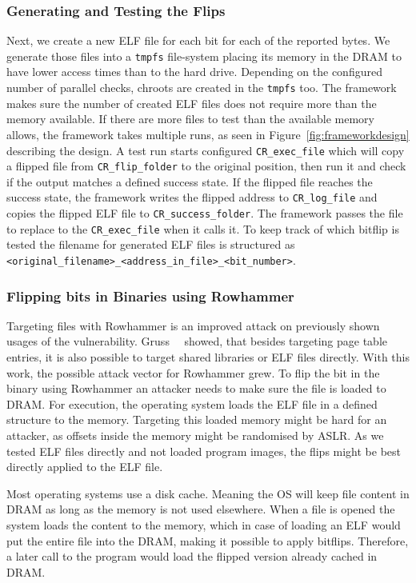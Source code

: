 \subsubsection{Generating and Testing the Flips}

Next, we create a new ELF file for each bit for each of the reported bytes. We
generate those files into a \texttt{tmpfs} file-system placing its memory in the
DRAM to have lower access times than to the hard drive. Depending on the
configured number of parallel checks, chroots are created in the \texttt{tmpfs}
too. The framework makes sure the number of created ELF files does not require
more than the memory available. If there are more files to test than the
available memory allows, the framework takes multiple runs, as seen in
Figure~\ref{fig:frameworkdesign} describing the design. A test run starts
configured \texttt{CR\_exec\_file} which will copy a flipped file from
\texttt{CR\_flip\_folder} to the original position, then run it and check if the
output matches a defined success state. If the flipped file reaches the success
state, the framework writes the flipped address to \texttt{CR\_log\_file} and
copies the flipped ELF file to \texttt{CR\_success\_folder}. The framework
passes the file to replace to the \texttt{CR\_exec\_file} when it calls it. To
keep track of which bitflip is tested the filename for generated ELF files is
structured as \texttt{<original\_filename>\_<address\_in\_file>\_<bit\_number>}.

\subsubsection{Flipping bits in Binaries using Rowhammer}

Targeting files with Rowhammer is an improved attack on previously shown usages
of the vulnerability. Gruss~\etal~\cite{flipinthewall} showed, that besides
targeting page table entries, it is also possible to target shared libraries or
ELF files directly. With this work, the possible attack vector for Rowhammer
grew. To flip the bit in the binary using Rowhammer an attacker needs to make
sure the file is loaded to DRAM. For execution, the operating system loads the
ELF file in a defined structure to the memory. Targeting this loaded memory
might be hard for an attacker, as offsets inside the memory might be
randomised by ASLR. As we tested ELF files directly and not loaded program
images, the flips might be best directly applied to the ELF file.

Most operating systems use a disk cache. Meaning the OS will keep file content
in DRAM as long as the memory is not used elsewhere. When a file is opened the
system loads the content to the memory, which in case of loading an ELF would
put the entire file into the DRAM, making it possible to apply bitflips.
Therefore, a later call to the program would load the flipped version already
cached in DRAM.

